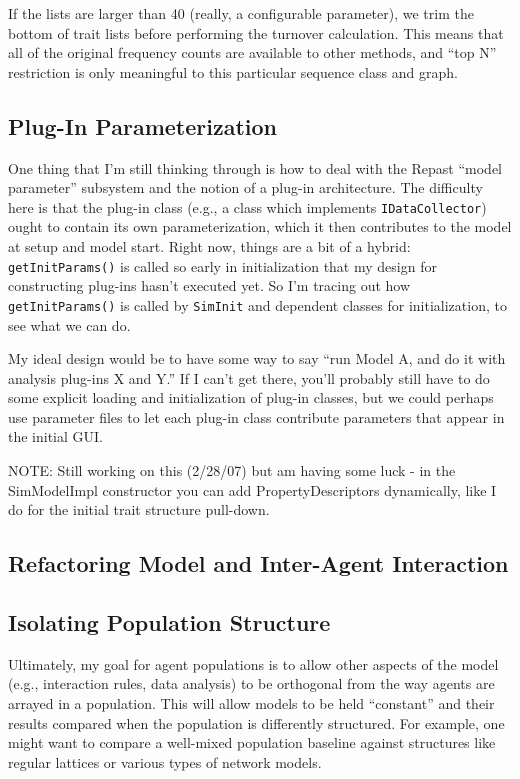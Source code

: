 \documentclass{kluwer-mem-copyright}
\begin{document}
\begin{article}
If the lists are larger than 40 (really, a configurable parameter), we trim the
bottom of trait lists before performing the turnover calculation.  This means
that all of the original frequency counts are available to other methods, and
``top N'' restriction is only meaningful to this particular sequence class and graph.


\subsection{Plug-In Parameterization}
One thing that I'm still thinking through is how to deal with the Repast ``model
parameter'' subsystem and the notion of a plug-in architecture.  The difficulty
here is that the plug-in class (e.g., a class which implements
\texttt{IDataCollector}) ought to contain its own parameterization, which it
then contributes to the model at setup and model start.  Right now, things are a
bit of a hybrid:  \texttt{getInitParams()} is called so early in initialization
that my design for constructing plug-ins hasn't executed yet.  So I'm tracing
out how \texttt{getInitParams()} is called by \texttt{SimInit} and dependent
classes for initialization, to see what we can do.  

My ideal design would be to have some way to say ``run Model A, and do it with
analysis plug-ins X and Y.''  If I can't get there, you'll probably still have
to do some explicit loading and initialization of plug-in classes, but we could
perhaps use parameter files to let each plug-in class contribute parameters that
appear in the initial GUI.  

NOTE:  Still working on this (2/28/07) but am having some luck - in the
SimModelImpl constructor you can add PropertyDescriptors dynamically, like I do
for the initial trait structure pull-down.

\subsection{Refactoring Model and Inter-Agent Interaction}

\subsection{Isolating Population Structure}
Ultimately, my goal for agent populations is to allow other aspects of the model
(e.g., interaction rules, data analysis) to be orthogonal from the way agents
are arrayed in a population.  This will allow models to be held ``constant'' and
their results compared when the population is differently structured.  For
example, one might want to compare a well-mixed population baseline against
structures like regular lattices or various types of network models.  


\end{article}
\end{document}
